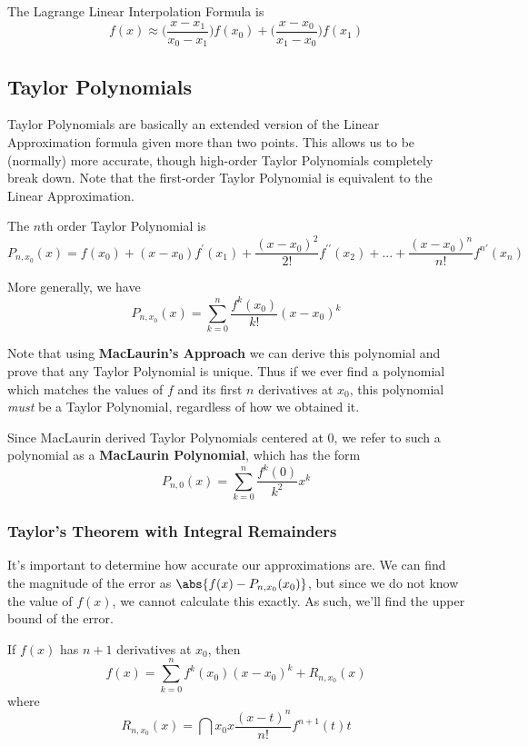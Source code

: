 \documentclass[12pt]{article}
\begin{document}
The Lagrange Linear Interpolation Formula is \[ f(x) \approx \bigg(\frac{x - x_1}{x_0 - x_1}\bigg)f(x_0) + \bigg(\frac{x - x_0}{x_1 - x_0}\bigg)f(x_1) \]

\subsection*{Taylor Polynomials}
Taylor Polynomials are basically an extended version of the Linear Approximation formula given more than two points. This allows us to be (normally) more accurate, though high-order Taylor Polynomials completely break down. Note that the first-order Taylor Polynomial is equivalent to the Linear Approximation.

The $n$th order Taylor Polynomial is \[ P_{n,x_0}(x) = f(x_0) + (x - x_0)f^\prime(x_1) + \frac{(x - x_0)^2}{2!} f^{\prime\prime}(x_2) + ... + \frac{(x - x_0)^n}{n!}f^{n\prime}(x_n) \]

More generally, we have \[ P_{n,x_0}(x) = \sum_{k=0}^n \frac{f^k(x_0)}{k!}(x - x_0)^k \]

Note that using {\bf MacLaurin's Approach} we can derive this polynomial and prove that any Taylor Polynomial is unique. Thus if we ever find a polynomial which matches the values of $f$ and its first $n$ derivatives at $x_0$, this polynomial \emph{must} be a Taylor Polynomial, regardless of how we obtained it.

Since MacLaurin derived Taylor Polynomials centered at 0, we refer to such a polynomial as a {\bf MacLaurin Polynomial}, which has the form \[ P_{n,0}(x) = \sum_{k=0}^n \frac{f^k(0)}{k^2} x^k \]

\subsubsection*{Taylor's Theorem with Integral Remainders}
It's important to determine how accurate our approximations are. We can find the magnitude of the error as $\abs{f(x) - P_{n,x_0}(x_0)}$, but since we do not know the value of $f(x)$, we cannot calculate this exactly. As such, we'll find the upper bound of the error.

If $f(x)$ has $n + 1$ derivatives at $x_0$, then \[ f(x) = \sum_{k=0}^n f^k(x_0)(x - x_0)^k + R_{n,x_0}(x) \] where \[ R_{n,x_0}(x) = \dint{x_0}{x}{\frac{(x-t)^n}{n!}f^{n+1}(t)}{t} \]
\end{document}
